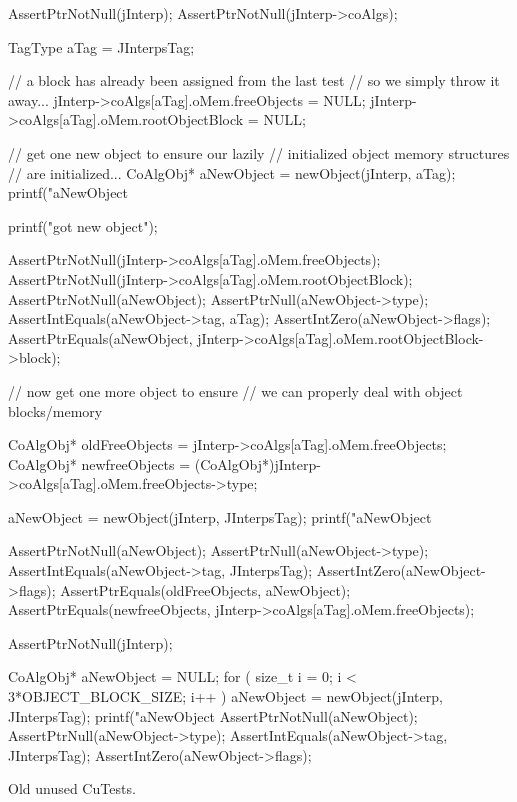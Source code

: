 \startCTest
  AssertPtrNotNull(jInterp);
  AssertPtrNotNull(jInterp->coAlgs);

  TagType aTag = JInterpsTag;
  
  // a block has already been assigned from the last test
  // so we simply throw it away...
  jInterp->coAlgs[aTag].oMem.freeObjects = NULL;
  jInterp->coAlgs[aTag].oMem.rootObjectBlock = NULL;

  // get one new object to ensure our lazily
  // initialized object memory structures 
  // are initialized...
  CoAlgObj* aNewObject = newObject(jInterp, aTag);
  printf("aNewObject %

  printf("got new object\n");
  
  AssertPtrNotNull(jInterp->coAlgs[aTag].oMem.freeObjects);
  AssertPtrNotNull(jInterp->coAlgs[aTag].oMem.rootObjectBlock);
  AssertPtrNotNull(aNewObject);
  AssertPtrNull(aNewObject->type);
  AssertIntEquals(aNewObject->tag, aTag);
  AssertIntZero(aNewObject->flags);
  AssertPtrEquals(aNewObject,
    jInterp->coAlgs[aTag].oMem.rootObjectBlock->block);

  // now get one more object to ensure
  // we can properly deal with object blocks/memory
  
  CoAlgObj* oldFreeObjects =
    jInterp->coAlgs[aTag].oMem.freeObjects;
  CoAlgObj* newfreeObjects = 
    (CoAlgObj*)jInterp->coAlgs[aTag].oMem.freeObjects->type;

  aNewObject = newObject(jInterp, JInterpsTag);
  printf("aNewObject %

  AssertPtrNotNull(aNewObject);
  AssertPtrNull(aNewObject->type);
  AssertIntEquals(aNewObject->tag, JInterpsTag);
  AssertIntZero(aNewObject->flags);
  AssertPtrEquals(oldFreeObjects, aNewObject);
  AssertPtrEquals(newfreeObjects, jInterp->coAlgs[aTag].oMem.freeObjects);
\stopCTest
\stopTestCase


\startCTest
  AssertPtrNotNull(jInterp);

  CoAlgObj* aNewObject = NULL;
  for ( size_t i = 0; i < 3*OBJECT_BLOCK_SIZE; i++ ) {
    aNewObject = newObject(jInterp, JInterpsTag);
    printf("aNewObject %
  }
  AssertPtrNotNull(aNewObject);
  AssertPtrNull(aNewObject->type);
  AssertIntEquals(aNewObject->tag, JInterpsTag);
  AssertIntZero(aNewObject->flags);
\stopCTest
\stopTestCase
\stopTestSuite

Old unused CuTests.

